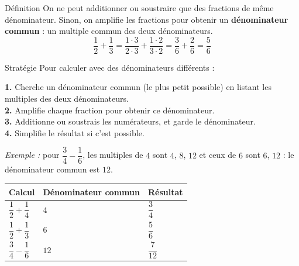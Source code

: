 \begin{regle}{Définition}
On ne peut additionner ou soustraire que des fractions de même dénominateur. Sinon, on \textcolor{themeColor}{amplifie} les fractions pour obtenir un \textbf{dénominateur commun} : un multiple commun des deux dénominateurs.
\[\dfrac{1}{2}+\dfrac{1}{3}=\dfrac{1 \cdot 3}{2 \cdot 3}+\dfrac{1 \cdot 2}{3 \cdot 2}=\dfrac{3}{6}+\dfrac{2}{6}=\dfrac{5}{6}\]
\end{regle}

\vspace{20pt}
\begin{astuce}{Stratégie}
Pour calculer avec des dénominateurs différents :

\vspace{5pt}
\textbf{1.} Cherche un dénominateur commun (le plus petit possible) en listant les multiples des deux dénominateurs.\\
\textbf{2.} Amplifie chaque fraction pour obtenir ce dénominateur.\\
\textbf{3.} Additionne ou soustrais les numérateurs, et garde le dénominateur.\\
\textbf{4.} Simplifie le résultat si c'est possible.

\vspace{5pt}
\textit{Exemple :} pour $\dfrac{3}{4}-\dfrac{1}{6}$, les multiples de $4$ sont $4$, $8$, $12$ et ceux de $6$ sont $6$, $12$ : le dénominateur commun est $12$.
\end{astuce}

\vspace{20pt}
\def\arraystretch{3}
\begin{tabularx}{\linewidth}{|>{\centering\arraybackslash}X|>{\centering\arraybackslash}X|>{\centering\arraybackslash}X|}
\hline
\cellcolor{themeNO!30}\textbf{Calcul} & \cellcolor{themeNO!30}\textbf{Dénominateur commun} & \cellcolor{themeNO!30}\textbf{Résultat} \\\hline
$\dfrac{1}{2}+\dfrac{1}{4}$ & $4$ & $\dfrac{3}{4}$ \\\hline
$\dfrac{1}{2}+\dfrac{1}{3}$ & $6$ & $\dfrac{5}{6}$ \\\hline
$\dfrac{3}{4}-\dfrac{1}{6}$ & $12$ & $\dfrac{7}{12}$ \\\hline
\end{tabularx}
\def\arraystretch{1}


\newpage


